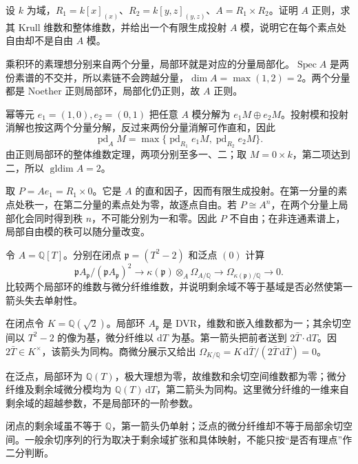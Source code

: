 \begin{exercise}\label{b3:ex:18-regular-product}
	设 \(k\) 为域，\(R_1=k[x]_{(x)}\)、\(R_2=k[y,z]_{(y,z)}\)、\(A=R_1\times R_2\)。证明 \(A\) 正则，求其 Krull 维数和整体维数，并给出一个有限生成投射 \(A\) 模，说明它在每个素点处自由却不是自由 \(A\) 模。
\end{exercise}
\begin{solution}
	乘积环的素理想分别来自两个分量，局部环就是对应的分量局部化。\(\operatorname{Spec}A\) 是两份素谱的不交并，所以素链不会跨越分量，\(\dim A=\max(1,2)=2\)。两个分量都是 Noether 正则局部环，局部化仍正则，故 \(A\) 正则。

	幂等元 \(e_1=(1,0),e_2=(0,1)\) 把任意 \(A\) 模分解为 \(e_1M\oplus e_2M\)。投射模和投射消解也按这两个分量分解，反过来两份分量消解可作直和，因此
	\[
		\operatorname{pd}_AM =\max\{\operatorname{pd}_{R_1}e_1M,\operatorname{pd}_{R_2}e_2M\}.
	\]
	由正则局部环的整体维数定理，两项分别至多一、二；取 \(M=0\times k\)，第二项达到二，所以 \(\operatorname{gldim}A=2\)。

	取 \(P=Ae_1=R_1\times0\)。它是 \(A\) 的直和因子，因而有限生成投射。在第一分量的素点处秩一，在第二分量的素点处为零，故逐点自由。若 \(P\cong A^n\)，在两个分量上局部化会同时得到秩 \(n\)，不可能分别为一和零。因此 \(P\) 不自由；在非连通素谱上，局部自由模的秩可以随分量改变。
\end{solution}

\begin{exercise}\label{b3:ex:18-inseparable-cotangent-sequence}
	令 \(A=\mathbb Q[T]\)。分别在闭点 \(\mathfrak p=(T^2-2)\) 和泛点 \((0)\) 计算
	\[
		\mathfrak pA_{\mathfrak p}/(\mathfrak pA_{\mathfrak p})^2 \longrightarrow\kappa(\mathfrak p)\otimes_A\Omega_{A/\mathbb Q} \longrightarrow\Omega_{\kappa(\mathfrak p)/\mathbb Q} \longrightarrow0.
	\]
	比较两个局部环的维数与微分纤维维数，并说明剩余域不等于基域是否必然使第一箭头失去单射性。
\end{exercise}
\begin{solution}
	在闭点令 \(K=\mathbb Q(\sqrt2)\)。局部环 \(A_{\mathfrak p}\) 是 DVR，维数和嵌入维数都为一；其余切空间以 \(T^2-2\) 的像为基，微分纤维以 \(\mathrm{d}T\) 为基。第一箭头把前者送到 \(2\bar T\cdot\mathrm{d}T\)。因 \(2\bar T\in K^\times\)，该箭头为同构。商微分展示又给出 \(\Omega_{K/\mathbb Q}=K\,\mathrm{d}\bar T/(2\bar T\,\mathrm{d}\bar T)=0\)。

	在泛点，局部环为 \(\mathbb Q(T)\)，极大理想为零，故维数和余切空间维数都为零；微分纤维及剩余域微分模均为 \(\mathbb Q(T)\,\mathrm{d}T\)，第二箭头为同构。这里微分纤维的一维来自剩余域的超越参数，不是局部环的一阶参数。

	闭点的剩余域虽不等于 \(\mathbb Q\)，第一箭头仍单射；泛点的微分纤维却不等于局部余切空间。一般余切序列的行为取决于剩余域扩张和具体映射，不能只按“是否有理点”作二分判断。
\end{solution}

